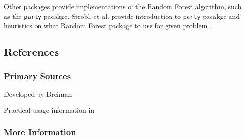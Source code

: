 Other packages provide implementations of the Random Forest algorithm, such as the \texttt{party} pacakge. Strobl, et al. provide introduction to \texttt{party} pacakge and heuristics on what Random Forest package to use for given problem \cite{Strobl2009} .


\subsection{References}

\subsubsection{Primary Sources}

Developed by Breiman \cite{Breiman2001}.

Practical usage information in \cite{Breiman2003}

\subsubsection{More Information}



